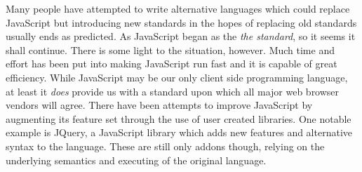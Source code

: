 Many people have attempted to
write alternative languages which could replace JavaScript but 
introducing new standards in the hopes of replacing old standards
usually ends as predicted. As JavaScript began as the \emph{the
standard}, so it seems it shall continue. There is some light to the
situation, however. Much time and effort has been put into making 
JavaScript run fast and it is capable of great efficiency. While 
JavaScript may be our only client side programming language, at least
it \emph{does} provide us with a standard upon which all major web 
browser vendors will agree. There have been attempts
to improve JavaScript by augmenting its feature set through the use
of user created libraries. One notable example is JQuery, a JavaScript
library which adds new features and alternative syntax to the language.
These are still only addons though, relying on the underlying semantics
and executing of the original language. 

